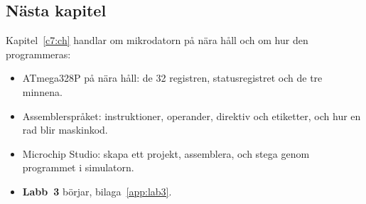 \subsection*{Nästa kapitel}
Kapitel~\ref{c7:ch} handlar om mikrodatorn på nära håll och om hur den programmeras:
\begin{itemize}
  \item ATmega328P på nära håll: de 32 registren, statusregistret och de tre minnena.
  \item Assemblerspråket: instruktioner, operander, direktiv och etiketter, och hur en rad blir
    maskinkod.
  \item Microchip Studio: skapa ett projekt, assemblera, och stega genom programmet i simulatorn.
  \item \textbf{Labb~3} börjar, bilaga~\ref{app:lab3}.
\end{itemize}
